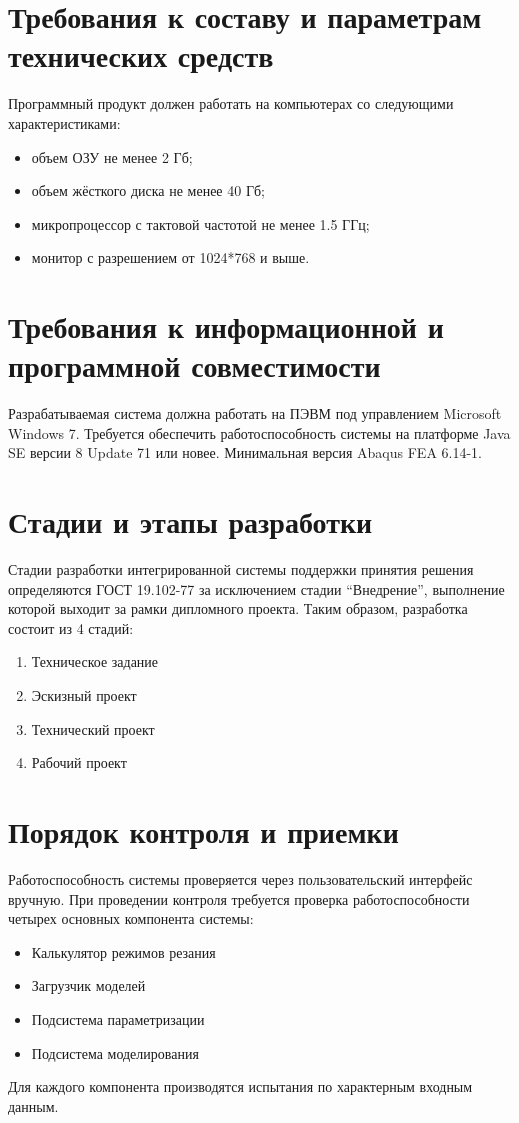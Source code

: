 \documentclass[14pt,oneside,final]{extreport}
\newcommand*\minus{\item[--]} %
\begin{document}
	\section{Требования к составу и параметрам технических средств}
	Программный продукт должен работать на компьютерах со следующими характеристиками:
	\begin{itemize}
		\minus объем ОЗУ не менее 2 Гб;
		\minus объем жёсткого диска не менее 40 Гб;
		\minus микропроцессор с тактовой частотой не менее 1.5 ГГц;
		\minus монитор с разрешением от 1024*768 и выше.
	\end{itemize}

	\section{Требования к информационной и программной совместимости}
	Разрабатываемая система должна работать на ПЭВМ под управлением Microsoft Windows 7. Требуется обеспечить работоспособность системы на платформе Java SE версии 8 Update 71 или новее. Минимальная версия Abaqus FEA 6.14-1.
	
	\section{Стадии и этапы разработки}
	Стадии разработки интегрированной системы поддержки принятия решения определяются ГОСТ 19.102-77 за исключением стадии ``Внедрение'', выполнение которой выходит за рамки дипломного проекта. Таким образом, разработка  состоит из 4 стадий:
	\begin{enumerate}
		\item Техническое задание
		\item Эскизный проект
		\item Технический проект
		\item Рабочий проект
	\end{enumerate}
	
	\section{Порядок контроля и приемки}
	Работоспособность системы проверяется через пользовательский интерфейс вручную.	При проведении контроля требуется проверка работоспособности четырех основных компонента системы: 
	\begin{itemize}
		\item Калькулятор режимов резания 
		\item Загрузчик моделей 
		\item Подсистема параметризации
		\item Подсистема моделирования
	\end{itemize}
	Для каждого компонента производятся испытания по характерным входным данным. 
\end{document}
